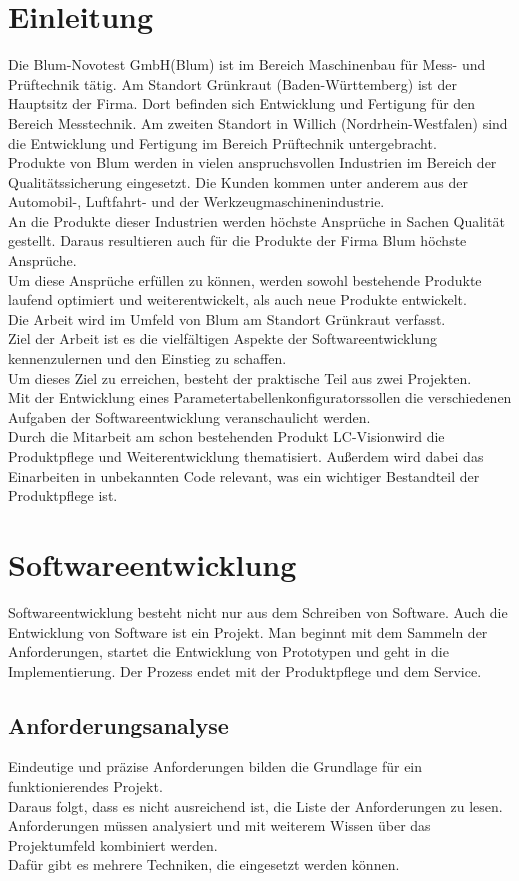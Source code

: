 \documentclass[12pt,a4paper]{article}
\begin{document}
\section{Einleitung}
Die Blum-Novotest GmbH(Blum) ist im Bereich Maschinenbau für Mess- und Prüftechnik tätig. Am Standort Grünkraut (Baden-Württemberg) ist der Hauptsitz der Firma. Dort befinden sich Entwicklung und Fertigung für den Bereich Messtechnik. Am zweiten Standort in Willich (Nordrhein-Westfalen) sind die Entwicklung und Fertigung im Bereich Prüftechnik untergebracht.\\
Produkte von Blum werden in vielen anspruchsvollen Industrien im Bereich der Qualitätssicherung eingesetzt. Die Kunden kommen unter anderem aus der Automobil-, Luftfahrt- und der Werkzeugmaschinenindustrie. \\
An die Produkte dieser Industrien werden höchste Ansprüche in Sachen Qualität gestellt. Daraus resultieren auch für die Produkte der Firma Blum höchste Ansprüche. \\
Um diese Ansprüche erfüllen zu können, werden sowohl bestehende Produkte laufend optimiert und weiterentwickelt, als auch neue Produkte entwickelt. \\
Die Arbeit wird im Umfeld von Blum am Standort Grünkraut verfasst. \\
Ziel der Arbeit ist es die vielfältigen Aspekte der Softwareentwicklung kennenzulernen und den Einstieg zu schaffen.\\
Um dieses Ziel zu erreichen, besteht der praktische Teil aus zwei Projekten.\\
Mit der Entwicklung eines \glqq Parametertabellenkonfigurators\grqq\space sollen die verschiedenen Aufgaben der Softwareentwicklung veranschaulicht werden.\\
Durch die Mitarbeit am schon bestehenden Produkt \glqq LC-Vision\grqq\space wird die Produktpflege und Weiterentwicklung thematisiert. 
Außerdem wird dabei das Einarbeiten in unbekannten Code relevant, was ein wichtiger Bestandteil der Produktpflege ist.
\newpage   
\section{Softwareentwicklung}
Softwareentwicklung besteht nicht nur aus dem Schreiben von Software. Auch die Entwicklung von Software ist ein Projekt. Man beginnt mit dem Sammeln der Anforderungen, startet die Entwicklung von Prototypen und geht in die Implementierung. Der Prozess endet mit der Produktpflege und dem Service.  
\subsection{Anforderungsanalyse}
Eindeutige und präzise Anforderungen bilden die Grundlage für ein funktionierendes Projekt\cite{doi:10.1080/12460125.2016.1187390}. \\
Daraus folgt, dass es nicht ausreichend ist, die Liste der Anforderungen zu lesen. Anforderungen müssen analysiert und mit weiterem Wissen über das Projektumfeld kombiniert werden. \\
Dafür gibt es mehrere Techniken, die eingesetzt werden können. 
\end{document}
